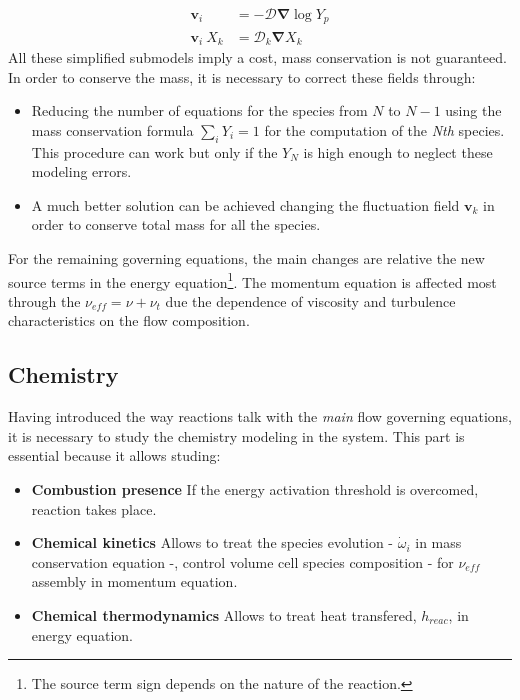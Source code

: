         \begin{align}
            \boldsymbol{v}_i & = - \mathcal{D} \boldsymbol{\nabla} \log{Y_p} \label{eqn:fick} \\ 
            \boldsymbol{v}_i \ X_k & = \mathcal{D}_k \boldsymbol{\nabla} X_k \label{eqn:hirsh}  
        \end{align}
   All these simplified submodels imply a cost, mass conservation is not guaranteed. In order to conserve the mass, it is necessary to correct these fields through:
   \begin{itemize}
       \item Reducing the number of equations for the species from $N$ to $N-1$ using the mass conservation formula $\sum_i Y_i = 1$ for the computation of the \textit{Nth} species. This procedure can work but only if the $Y_N$ is high enough to neglect these modeling errors. 
       \item A much better solution can be achieved changing the fluctuation field $\boldsymbol{v}_k$ in order to conserve total mass for all the species.
   \end{itemize}

    For the remaining governing equations, the main changes are relative the new source terms in the energy equation\footnote{The source term sign depends on the nature of the reaction.}. The momentum equation is affected most through the $\nu_{eff} = \nu + \nu_t$ due the dependence of viscosity and turbulence characteristics on the flow composition. 

    \subsection{Chemistry}
    Having introduced the way reactions talk with the \textit{main} flow governing equations, it is necessary to study the chemistry modeling in the system. This part is essential because it allows studing:
    \begin{itemize}
        \item \textbf{Combustion presence} If the energy activation threshold is overcomed, reaction takes place.
        \item \textbf{Chemical kinetics} Allows to treat the species evolution - $\dot\omega_i$ in mass conservation equation -, control volume cell species composition - for $\nu_{eff}$ assembly in momentum equation.
        \item \textbf{Chemical thermodynamics} Allows to treat heat transfered, $h_{reac}$, in energy equation. 
    \end{itemize}
    

